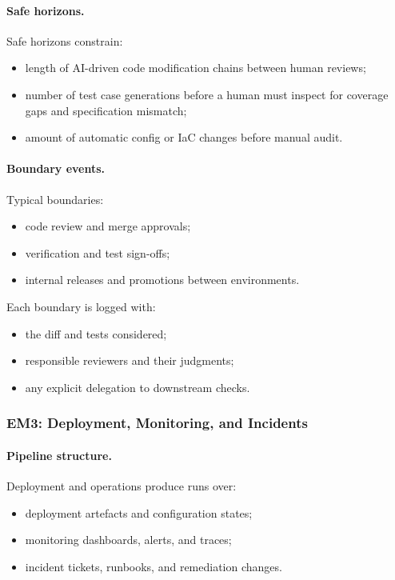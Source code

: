 \paragraph{Safe horizons.}
Safe horizons constrain:

\begin{itemize}
  \item length of AI-driven code modification chains between human reviews;
  \item number of test case generations before a human must inspect for
        coverage gaps and specification mismatch;
  \item amount of automatic config or IaC changes before manual audit.
\end{itemize}

\paragraph{Boundary events.}
Typical boundaries:

\begin{itemize}
  \item code review and merge approvals;
  \item verification and test sign-offs;
  \item internal releases and promotions between environments.
\end{itemize}

Each boundary is logged with:

\begin{itemize}
  \item the diff and tests considered;
  \item responsible reviewers and their judgments;
  \item any explicit delegation to downstream checks.
\end{itemize}

\subsubsection*{EM3: Deployment, Monitoring, and Incidents}

\paragraph{Pipeline structure.}
Deployment and operations produce runs over:

\begin{itemize}
  \item deployment artefacts and configuration states;
  \item monitoring dashboards, alerts, and traces;
  \item incident tickets, runbooks, and remediation changes.
\end{itemize}

